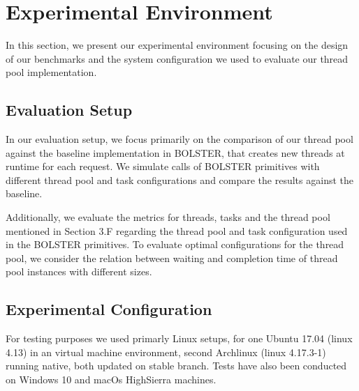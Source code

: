 \documentclass[conference]{IEEEtran}
\begin{document}
\section{Experimental Environment}
In this section, we present our experimental environment focusing on the design of our benchmarks and the system configuration we used to evaluate our thread pool implementation.

\subsection{Evaluation Setup}
In our evaluation setup, we focus primarily on the comparison of our thread pool against the baseline implementation in BOLSTER, that creates new threads at runtime for each request. We simulate calls of BOLSTER primitives with different thread pool and task configurations and compare the results against the baseline.

Additionally, we evaluate the metrics for threads, tasks and the thread pool mentioned in Section 3.F regarding the thread pool and task configuration used in the BOLSTER primitives. To evaluate optimal configurations for the thread pool, we consider the relation between waiting and completion time of  thread pool instances with different sizes.


\subsection{Experimental Configuration}

For testing purposes we used primarly Linux setups, for one Ubuntu 17.04
(linux 4.13) in an virtual machine environment, second Archlinux (linux
4.17.3-1) running native, both updated on stable branch. Tests have also been
conducted on Windows 10 and macOs HighSierra machines.
\end{document}
